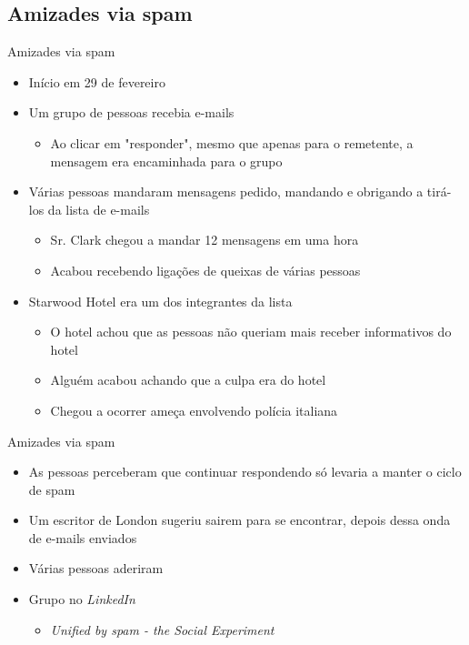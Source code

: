 \documentclass[dvipdfm]{beamer}
\begin{document}
\subsection{Amizades via spam}
\begin{frame}{Amizades via spam}
	\begin{itemize}
		\item Início em 29 de fevereiro
		\item Um grupo de pessoas recebia e-mails
		\begin{itemize}
			\item Ao clicar em "responder", mesmo que apenas para o remetente, a mensagem era encaminhada para o grupo
		\end{itemize}
		\item Várias pessoas mandaram mensagens pedido, mandando e obrigando a tirá-los da lista de e-mails
		\begin{itemize}
			\item Sr. Clark chegou a mandar 12 mensagens em uma hora
			\item Acabou recebendo ligações de queixas de várias pessoas
		\end{itemize}
		\item Starwood Hotel era um dos integrantes da lista
		\begin{itemize}
			\item O hotel achou que as pessoas não queriam mais receber informativos do hotel
			\item Alguém acabou achando que a culpa era do hotel
			\item Chegou a ocorrer ameça envolvendo polícia italiana
		\end{itemize}
	\end{itemize}
\end{frame}

\begin{frame}{Amizades via spam}
	\begin{itemize}
		\item As pessoas perceberam que continuar respondendo só levaria a manter o ciclo de spam
		\item Um escritor de London sugeriu sairem para se encontrar, depois dessa onda de e-mails enviados
		\item Várias pessoas aderiram
		\item Grupo no \emph{LinkedIn}
		\begin{itemize}
			\item \emph{Unified by spam - the Social Experiment}
		\end{itemize}
	\end{itemize}
\end{frame}
\end{document}
